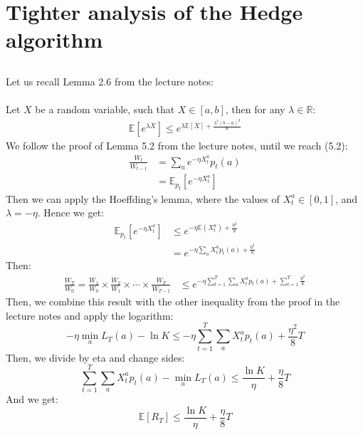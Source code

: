 \documentclass[a4paper]{article}
\newcommand{\expect}[1]{\mathbb{E}\left(#1\right)}
\begin{document}
\section{Tighter analysis of the Hedge algorithm}
\label{sec:2}
\subsection{}
\label{subsec:21}
Let us recall Lemma 2.6 from the lecture notes:\\\\
Let $X$ be a random variable, such that $X \in [a,b]$, then for any $\lambda \in \mathbb{R}$:
\begin{align}
  \label{hoeff}
  \mathbb{E}\left[e^{\lambda X}\right] \leq e^{\lambda \mathbb{E}[X]+\frac{\lambda^{2}(b-a)^{2}}{8}}
\end{align}
We follow the proof of Lemma 5.2 from the lecture notes, until we reach (5.2):
\begin{align*}
  \frac{W_t}{W_{t-1}} &= \sum_a e^{-\eta X_t^a}p_t(a)\\
  &= \mathbb{E}_{p_t}[e^{-\eta X_t^a}]
\end{align*}
Then we can apply the Hoeffding's lemma, where the values of $X_t^{a} \in [0,1]$,
and $\lambda = -\eta$. Hence we get:
\begin{align*}
  \mathbb{E}_{p_t}[e^{-\eta X_t^a}] &\leq e^{-\eta \expect{X_t^a} + \frac{\eta^2}{8}}\\
  &=e^{-\eta \sum_a X_t^a p_t(a) + \frac{\eta^2}{8}}
\end{align*}
Then:
\begin{align*}
  \frac{W_{T}}{W_{0}}=\frac{W_{1}}{W_{0}} \times \frac{W_{2}}{W_{1}} \times
  \cdots \times \frac{W_{T}}{W_{T-1}} &\leq
  e^{-\eta \sum_{t=1}^{T} \sum_{a} X_{t}^{a} p_{t}(a)+ \sum_{t=1}^{T}\frac{\eta^{2}}{8}}
\end{align*}
Then, we combine this result with the other inequality from the proof in the lecture
notes and apply the logarithm:
\[
-\eta \min _{a} L_{T}(a)-\ln K \leq
-\eta \sum_{t=1}^{T} \sum_{a} X_{t}^{a} p_{t}(a)+
\frac{\eta^{2}}{8} T
\]
Then, we divide by eta and change sides:
\[
\sum_{t=1}^{T} \sum_{a} X_{t}^{a} p_{t}(a)-\min _{a} L_{T}(a)
\leq
\frac{\ln K}{\eta}+\frac{\eta}{8}T
\]
And we get:
\[
\mathbb{E}\left[R_{T}\right] \leq \frac{\ln K}{\eta}+\frac{\eta}{8} T
\]
\end{document}
